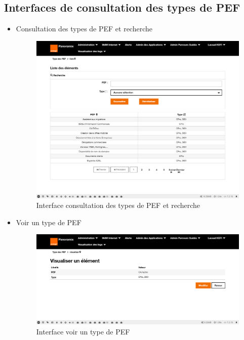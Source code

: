 \subsection{Interfaces de consultation des types de PEF}
\begin{itemize}
	\item Consultation des types de PEF et recherche
	\begin{figure}[H]
		\centering
		\includegraphics[width=0.7\linewidth]{img/screenshots/pef-type/index}
		\caption[Interface consultation des types de PEF et recherche]{Interface consultation des types de PEF et recherche}
		\label{fig:index-tp}
	\end{figure}
	
	\item Voir un type de PEF 
	\begin{figure}[H]
		\centering
		\includegraphics[width=0.7\linewidth]{img/screenshots/pef-type/view}
		\caption[Interface voir un type de PEF ]{Interface voir un type de PEF }
		\label{fig:view-tp}
	\end{figure}
\end{itemize}
\newpage
